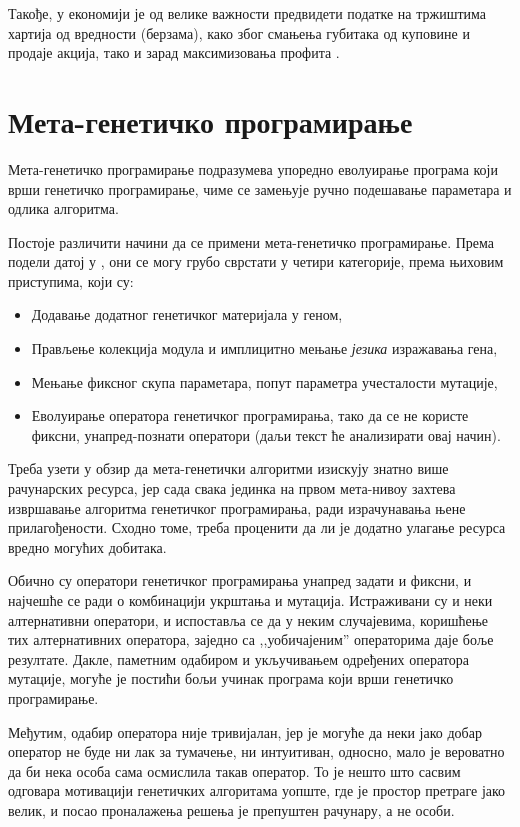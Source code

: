 \documentclass[a4paper]{article}
\begin{document}
Такође, у економији је од велике важности предвидети податке на тржиштима хартија од вредности (берзама), како због смањења губитака од куповине и продаје акција, тако и зарад максимизовања профита \cite{stock}.

\section{Мета-генетичко програмирање}

Мета-генетичко програмирање подразумева упоредно еволуирање програма који врши генетичко програмирање, чиме се замењује ручно подешавање параметара и одлика алгоритма.


Постоје различити начини да се примени мета-генетичко програмирање. Према подели датој у \cite{edmonds2001meta}, они се могу грубо сврстати у четири категорије, према њиховим приступима, који су:

\begin{itemize}
	\item Додавање додатног генетичког материјала у геном,
	\item Прављење колекција модула и имплицитно мењање \emph{језика} изражавања гена,
	\item Мењање фиксног скупа параметара, попут параметра учесталости мутације,
	\item Еволуирање оператора генетичког програмирања, тако да се не користе фиксни, унапред-познати оператори (даљи текст ће анализирати овај начин).
\end{itemize}

Треба узети у обзир да мета-генетички алгоритми изискују знатно више рачунарских ресурса, јер сада свака јединка на првом мета-нивоу захтева извршавање алгоритма генетичког програмирања, ради израчунавања њене прилагођености. Сходно томе, треба проценити да ли је додатно улагање ресурса вредно могућих добитака.

Обично су оператори генетичког програмирања унапред задати и фиксни, и најчешће се ради о комбинацији укрштања и мутација. Истраживани су и неки алтернативни оператори, и испоставља се да у неким случајевима, коришћење тих алтернативних оператора, заједно са ,,уобичајеним'' операторима даје боље резултате. Дакле, паметним одабиром и укључивањем одређених оператора мутације, могуће је постићи бољи учинак програма који врши генетичко програмирање.


Међутим, одабир оператора није тривијалан, јер је могуће да неки јако добар оператор не буде ни лак за тумачење, ни интуитиван, односно, мало је вероватно да би нека особа сама осмислила такав оператор. То је нешто што сасвим одговара мотивацији генетичких алгоритама уопште, где је простор претраге јако велик, и посао проналажења решења је препуштен рачунару, а не особи.
\end{document}

